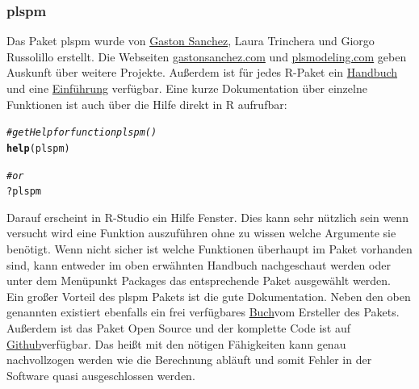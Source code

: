 \documentclass{article}\usepackage[]{graphicx}\usepackage[]{color}
\makeatletter
\newcommand{\hlcom}[1]{\textcolor[rgb]{0.678,0.584,0.686}{\textit{#1}}}%
\newcommand{\hlopt}[1]{\textcolor[rgb]{0,0,0}{#1}}%
\newcommand{\hlstd}[1]{\textcolor[rgb]{0.345,0.345,0.345}{#1}}%
\newcommand{\hlkwd}[1]{\textcolor[rgb]{0.737,0.353,0.396}{\textbf{#1}}}%
\newenvironment{kframe}{%
 \def\at@end@of@kframe{}%
 \ifinner\ifhmode%
  \def\at@end@of@kframe{\end{minipage}}%
  \begin{minipage}{\columnwidth}%
 \fi\fi%
 \def\FrameCommand##1{\hskip\@totalleftmargin \hskip-\fboxsep
 \colorbox{shadecolor}{##1}\hskip-\fboxsep
     \hskip-\linewidth \hskip-\@totalleftmargin \hskip\columnwidth}%
 \MakeFramed {\advance\hsize-\width
   \@totalleftmargin\z@ \linewidth\hsize
   \@setminipage}}%
 {\par\unskip\endMakeFramed%
 \at@end@of@kframe}
\newenvironment{knitrout}{}{} %
\makeatother
\begin{document}
\subsubsection{plspm}
Das Paket plspm\cite{sanchez2013pls} wurde von \href{gaston.stat@gmail.com}{Gaston Sanchez}, Laura Trinchera und Giorgo Russolillo erstellt. Die Webseiten \href{http://gastonsanchez.com}{gastonsanchez.com} und \href{http://www.plsmodeling.com/}{plsmodeling.com} geben Auskunft über weitere Projekte. Außerdem ist für jedes R-Paket ein \href{http://cran.r-project.org/web/packages/plspm/plspm.pdf}{Handbuch} und eine \href{http://cran.r-project.org/web/packages/plspm/vignettes/plspm_introduction.pdf}{Einführung} verfügbar. Eine kurze Dokumentation über einzelne Funktionen ist auch über die Hilfe direkt in R aufrufbar:
\begin{knitrout}
\color{fgcolor}\begin{kframe}
\begin{alltt}
\hlcom{#get Help for function plspm()}
\hlkwd{help}\hlstd{(plspm)}

\hlcom{#or}
\hlopt{?}\hlstd{plspm}
\end{alltt}
\end{kframe}
\end{knitrout}
Darauf erscheint in R-Studio ein Hilfe Fenster. Dies kann sehr nützlich sein wenn versucht wird eine Funktion auszuführen ohne zu wissen welche Argumente sie benötigt. Wenn nicht sicher ist welche Funktionen überhaupt im Paket vorhanden sind, kann entweder im oben erwähnten Handbuch nachgeschaut werden oder unter dem Menüpunkt Packages das entsprechende Paket ausgewählt werden.\\
Ein großer Vorteil des plspm Pakets ist die gute Dokumentation. Neben den oben genannten existiert ebenfalls ein frei verfügbares \href{http://www.gastonsanchez.com/PLS Path Modeling with R.pdf}{Buch}\cite{sanchez2013pls}vom Ersteller des Pakets. Außerdem ist das Paket Open Source und der komplette Code ist auf \href{https://github.com/gastonstat/plspm}{Github}verfügbar. Das heißt mit den nötigen Fähigkeiten kann genau nachvollzogen werden wie die Berechnung abläuft und somit Fehler in der Software quasi ausgeschlossen werden.\\
\end{document}
